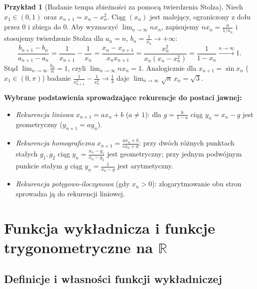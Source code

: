 \documentclass[11pt, a4paper]{article}
\theoremstyle{plain}
\theoremstyle{definition}
\newtheorem*{przyklad}{Przykład}
\begin{document}
\begin{przyklad}[Badanie tempa zbieżności za pomocą twierdzenia Stolza]
Niech $x_1 \in (0, 1)$ oraz $x_{n+1} = x_n - x_n^2$. Ciąg $(x_n)$ jest malejący, ograniczony z dołu przez $0$ i zbiega do $0$. Aby wyznaczyć $\lim_{n\to\infty} n x_n$, zapisujemy $n x_n = \frac{n}{1/x_n}$ i stosujemy twierdzenie Stolza dla $a_n = n$, $b_n = \frac{1}{x_n} \to +\infty$:
\[
\frac{b_{n+1} - b_n}{a_{n+1} - a_n} = \frac{1}{x_{n+1}} - \frac{1}{x_n} = \frac{x_n - x_{n+1}}{x_n x_{n+1}} = \frac{x_n^2}{x_n(x_n - x_n^2)} = \frac{1}{1 - x_n} \xrightarrow{n\to\infty} 1.
\]
Stąd $\lim_{n\to\infty} \frac{b_n}{n} = 1$, czyli $\lim_{n\to\infty} n x_n = 1$. Analogicznie dla $x_{n+1} = \sin x_n$ ($x_1 \in (0, \pi)$) badanie $\frac{1}{x_{n+1}^2} - \frac{1}{x_n^2} \to \frac{1}{3}$ daje $\lim_{n\to\infty} \sqrt{n}\, x_n = \sqrt{3}$.
\end{przyklad}

\noindent\textbf{Wybrane podstawienia sprowadzające rekurencje do postaci jawnej:}
\begin{itemize}
    \item \emph{Rekurencja liniowa} $x_{n+1} = a x_n + b$ ($a \neq 1$): dla $g = \frac{b}{1-a}$ ciąg $y_n = x_n - g$ jest geometryczny ($y_{n+1} = a y_n$).
    \item \emph{Rekurencja homograficzna} $x_{n+1} = \frac{a x_n + b}{c x_n + d}$: przy dwóch różnych punktach stałych $g_1, g_2$ ciąg $y_n = \frac{x_n - g_1}{x_n - g_2}$ jest geometryczny; przy jednym podwójnym punkcie stałym $g$ ciąg $y_n = \frac{1}{x_n - g}$ jest arytmetyczny.
    \item \emph{Rekurencja potęgowo-iloczynowa} (gdy $x_n > 0$): zlogarytmowanie obu stron sprowadza ją do rekurencji liniowej.
\end{itemize}

\section{Funkcja wykładnicza i funkcje trygonometryczne na $\mathbb{R}$}

\subsection{Definicje i własności funkcji wykładniczej}
\end{document}
